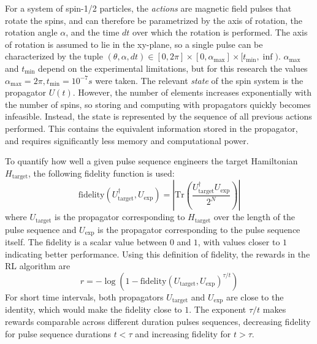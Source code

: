 \documentclass{article}
\begin{document}
For a system of spin-1/2 particles, the \emph{actions} are magnetic field pulses that rotate the spins, and can therefore be parametrized by the axis of rotation, the rotation angle $\alpha$, and the time $dt$ over which the rotation is performed.
The axis of rotation is assumed to lie in the xy-plane, so a single pulse can be characterized by the tuple $(\theta, \alpha, dt) \in [0,2\pi] \times [0, \alpha_\text{max}] \times [t_\text{min}, \inf)$. $\alpha_\text{max}$ and $t_\text{min}$ depend on the experimental limitations, but for this research the values $\alpha_\text{max} = 2\pi, t_\text{min} = 10^{-7}s$ were taken.
The relevant \emph{state} of the spin system is the propagator $U(t)$. However, the number of elements increases exponentially with the number of spins, so storing and computing with propagators quickly becomes infeasible.
Instead, the state is represented by the sequence of all previous actions performed. This contains the equivalent information stored in the propagator, and requires significantly less memory and computational power.

To quantify how well a given pulse sequence engineers the target Hamiltonian $H_\text{target}$, the following fidelity function is used:
\begin{equation}\label{eq:fidelity}
    \text{fidelity}(U_\text{target}^\dagger, U_\text{exp}) = \left| \text{Tr}\left( \frac{U_\text{target}^\dagger U_\text{exp}}{2^N} \right) \right|
\end{equation}
where $U_\text{target}$ is the propagator corresponding to $H_\text{target}$ over the length of the pulse sequence and $U_\text{exp}$ is the propagator corresponding to the pulse sequence itself. The fidelity is a scalar value between $0$ and $1$, with values closer to $1$ indicating better performance. Using this definition of fidelity, the rewards in the RL algorithm are
\begin{equation}\label{eq:rewards}
    r = -\log\left( 1- \text{fidelity}(U_\text{target}, U_\text{exp})^{\tau/t} \right)
\end{equation}
For short time intervals, both propagators $U_\text{target}$ and $U_\text{exp}$ are close to the identity, which would make the fidelity close to $1$. The exponent $\tau/t$ makes rewards comparable across different duration pulses sequences, decreasing fidelity for pulse sequence durations $t<\tau$ and increasing fidelity for $t>\tau$.
\end{document}
